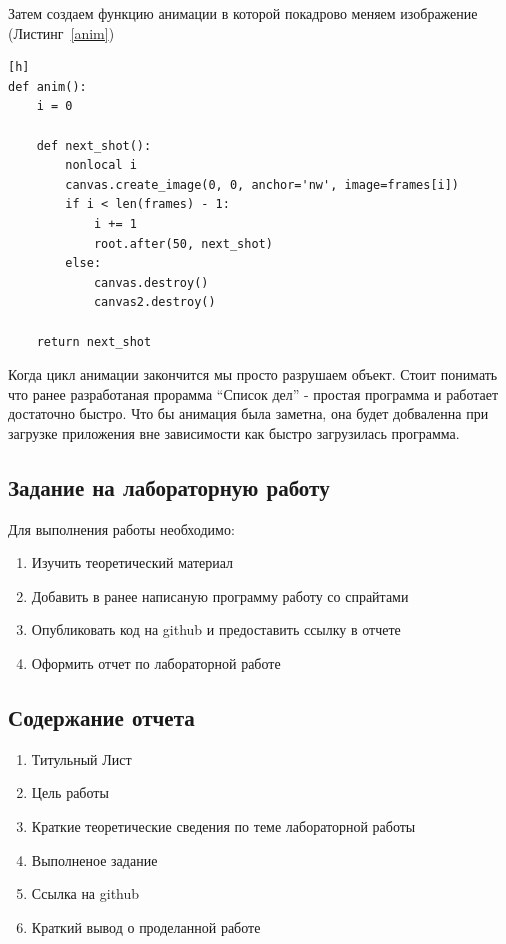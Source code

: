 \documentclass[a4paper]{article}
\begin{document}
Затем создаем функцию анимации в которой покадрово меняем изображение (Листинг~\ref{anim})

\begin{lstlisting}[label=anim, caption=Функция анимации][h]
def anim():
    i = 0

    def next_shot():
        nonlocal i
        canvas.create_image(0, 0, anchor='nw', image=frames[i])
        if i < len(frames) - 1:
            i += 1
            root.after(50, next_shot)
        else:
            canvas.destroy()
            canvas2.destroy()

    return next_shot
\end{lstlisting}

Когда цикл анимации закончится мы просто разрушаем объект. Стоит понимать что ранее разработаная прорамма ``Список дел'' - простая программа и работает достаточно быстро. Что бы анимация была заметна, она будет добваленна при загрузке приложения вне зависимости как быстро загрузилась программа.



\newpage
\subsection{Задание на лабораторную работу}

Для выполнения работы необходимо:
\begin{enumerate}
  \item Изучить теоретический материал
  \item Добавить в ранее написаную программу работу со спрайтами
  \item Опубликовать код на github и предоставить ссылку в отчете
  \item Оформить отчет по лабораторной работе
\end{enumerate}

\subsection{Содержание отчета}
\begin{enumerate}
  \item Титульный Лист
  \item Цель работы
  \item Краткие теоретические сведения по теме лабораторной работы
  \item Выполненое задание
  \item Ссылка на github
  \item Краткий вывод о проделанной работе
\end{enumerate}
\end{document}
